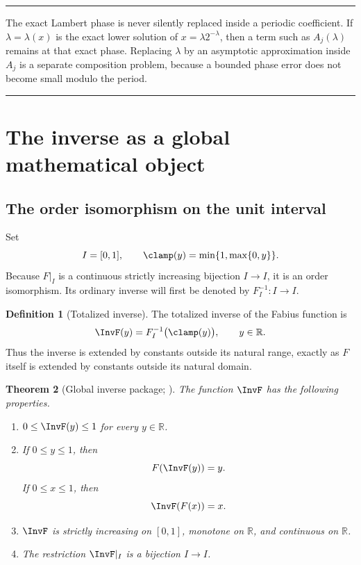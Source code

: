 \documentclass[11pt,oneside]{article}
\newtheorem{theorem}{Theorem}[section]
\theoremstyle{definition}
\newtheorem{definition}[theorem]{Definition}
\theoremstyle{remark}
\newcommand{\R}{\mathbb R}
\newenvironment{boxedremark}{%
  \par\smallskip\noindent\begin{center}\begin{minipage}{0.94\textwidth}%
  \color{black}\hrule\vspace{0.6em}\small
}{%
  \vspace{0.6em}\hrule\end{minipage}\end{center}\smallskip
}
\begin{document}
\begin{boxedremark}
The exact Lambert phase is never silently replaced inside a periodic
coefficient.  If $\lambda=\lambda(x)$ is the exact lower solution of
$x=\lambda2^{-\lambda}$, then a term such as $A_j(\lambda)$ remains at that
exact phase.  Replacing $\lambda$ by an asymptotic approximation inside
$A_j$ is a separate composition problem, because a bounded phase error
does not become small modulo the period.
\end{boxedremark}

\section{The inverse as a global mathematical object}
\label{inverse:sec:inverse}

\subsection{The order isomorphism on the unit interval}

Set
\[
 I=[0,1],\qquad
 \clamp(y)=\min\{1,\max\{0,y\}\}.
\]
Because $F|_I$ is a continuous strictly increasing bijection $I\to I$, it
is an order isomorphism.  Its ordinary inverse will first be denoted by
$F_I^{-1}:I\to I$.

\begin{definition}[Totalized inverse]
\label{inverse:def:totalized-inverse}
The totalized inverse of the Fabius function is
\[
 \InvF(y)=F_I^{-1}\bigl(\clamp(y)\bigr),\qquad y\in\R.
\]
Thus the inverse is extended by constants outside its natural range,
exactly as $F$ itself is extended by constants outside its natural domain.
\end{definition}

\begin{theorem}[Global inverse package; \Formalized]
\label{inverse:thm:inverse-package}
The function $\InvF$ has the following properties.
\begin{enumerate}
\item $0\leq \InvF(y)\leq1$ for every $y\in\R$.
\item If $0\leq y\leq1$, then
\[
 F(\InvF(y))=y.
\]
If $0\leq x\leq1$, then
\[
 \InvF(F(x))=x.
\]
\item $\InvF$ is strictly increasing on $[0,1]$, monotone on $\R$, and
continuous on $\R$.
\item The restriction $\InvF|_I$ is a bijection $I\to I$.
\end{enumerate}
\end{theorem}
\end{document}
